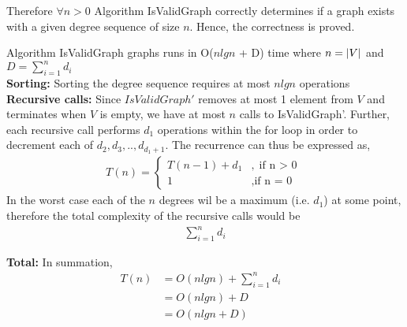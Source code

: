 \documentclass[12pt]{article}
\newenvironment{lemma}[2][Lemma]{\begin{trivlist}
\item[\hskip \labelsep {\bfseries #1}\hskip \labelsep {\bfseries #2.}]}{\end{trivlist}}
\newenvironment{question}[2][Question]{\begin{trivlist}
\item[\hskip \labelsep {\bfseries #1}\hskip \labelsep {\bfseries #2.}]}{\end{trivlist}}
\DeclarePairedDelimiter\abs{\lvert}{\rvert}%
\begin{document}
\begin{question}{3 (c)}
\begin{lemma}{3.1}
    Therefore $\forall n > 0$ Algorithm IsValidGraph correctly determines if a
    graph exists with a given degree sequence of size $n$. Hence, the correctness
    is proved.
  \end{lemma}

  \begin{lemma}{3.2} Algorithm IsValidGraph graphs runs in O($nlgn$ + D) time where
    $n = \abs{V}$ and $D = \sum_{i=1}^{n} d_{i}$
    \leavevmode \\

    \textbf{Sorting:} Sorting the degree sequence requires at most $nlgn$ operations \\

    \textbf{Recursive calls:} Since $IsValidGraph'$ removes at most 1 element from
    $V$ and terminates when $V$ is empty, we have at most $n$ calls to IsValidGraph'.
    Further, each recursive call performs $d_{1}$ operations within the for
    loop in order to decrement each of $d_{2},d_{3},..,d_{d_{1}+1}$. The recurrence
    can thus be expressed as,
    \begin{align*}
      T(n) = \begin{cases}
                T(n - 1) + d_{1} &, \text{if n $>$ 0} \\
                1                &, \text{if n = 0}
             \end{cases}
    \end{align*}
    In the worst case each of the $n$ degrees wil be a maximum (i.e. $d_{1}$) at some point,
    therefore the total complexity of the recursive calls would be
    \begin{align*}
      \sum_{i=1}^{n} d_{i}
    \end{align*}

    \textbf{Total:} In summation,
    \begin{align*}
      T(n) & = O(nlgn) + \sum_{i=1}^{n} d_{i} & \\
           & = O(nlgn) + D & \\
           & = O(nlgn + D) &
    \end{align*}
  \end{lemma}
\end{question}
\end{document}
